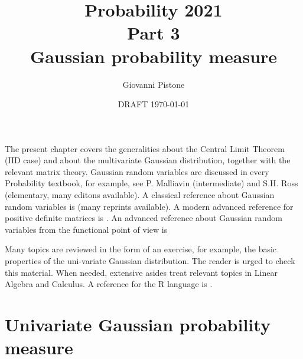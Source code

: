 \documentclass[12pt,a4paper]{amsart}
\title{Probability 2021 \\ Part 3 \\
Gaussian probability measure}
\author[G. Pistone]{Giovanni Pistone}
\date{DRAFT \today}
\theoremstyle{plain}%
\theoremstyle{definition}
\theoremstyle{remark}
\begin{document}
\maketitle
\tableofcontents

The present chapter covers the generalities about the Central Limit
Theorem (IID case) and about the multivariate Gaussian distribution,
together with the relevant matrix theory. Gaussian random variables
are discussed in every Probability textbook, for example, see
P. Malliavin \cite[Ch.~V]{malliavin:1995} (intermediate) and S.H. Ross
\cite[Ch.~10]{ross:2010introduction10} (elementary, many editons
available). A classical reference about Gaussian random variables is
\cite{anderson:2003-3ed} (many reprints available). A modern advanced
reference for positive definite matrices is \cite{bhatia:2007}. An
advanced reference about Gaussian random variables from the functional
point of view is \cite{janson:1997-GHS}

Many topics are reviewed in the form of an exercise, for example, the
basic properties of the uni-variate Gaussian distribution. The reader
is urged to check this material. When needed, extensive asides treat
relevant topics in Linear Algebra and Calculus. A reference for the R
language is \cite{rcoreteam:2020}.

\section{Univariate Gaussian probability measure}
\label{sec:introduction}
\end{document}
